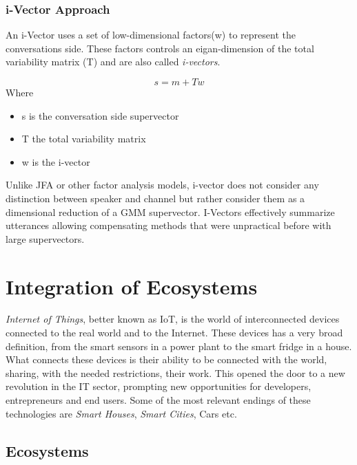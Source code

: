 \subsubsection{i-Vector Approach}

An i-Vector uses a set of low-dimensional factors(w) to represent the conversations
side. These factors controls an eigan-dimension of the total variability matrix (T) and
are also called \textit{i-vectors}.

\begin{equation}
    s = m + Tw
\end{equation}
Where
\begin{itemize}
    \item s is the conversation side supervector
    \item T the total variability matrix
    \item w is the i-vector
\end{itemize}
Unlike JFA or other factor analysis models, i-vector does not consider any
distinction between speaker and channel but rather consider them as a dimensional
reduction of a GMM supervector. I-Vectors effectively summarize utterances allowing
compensating methods that were unpractical before with large supervectors.

\section{Integration of Ecosystems}
\label{integration}

\textit{Internet of Things}, better known as IoT, is the world of interconnected devices
connected to the real world and to the Internet. These devices has a very
broad definition, from the smart sensors in a power plant to the smart fridge in
a house. What connects these devices is their ability to be connected with the world,
sharing, with the needed restrictions, their work. This opened the door to a new
revolution in the IT sector, prompting new opportunities for developers, entrepreneurs
and end users. Some of the most relevant endings of these technologies are \textit{Smart Houses},
\textit{Smart Cities}, Cars etc. %

\subsection{Ecosystems}
\label{ecosystems}


